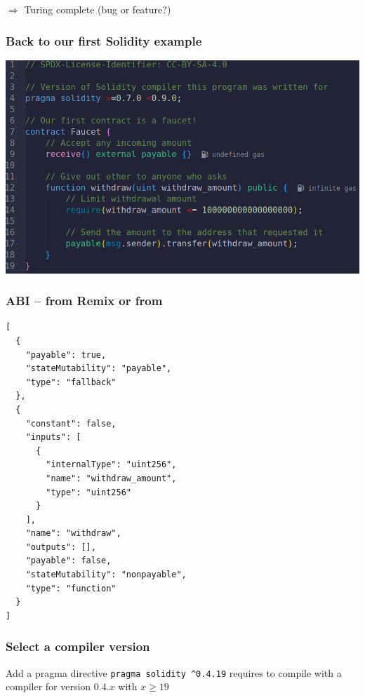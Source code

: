 \documentclass[11pt]{beamer}  %
\def\codesize{\smaller}
\def\<#1>{\codeid{#1}}
\newcommand{\codeid}[1]{\ifmmode{\mbox{\codesize\ttfamily{#1}}}\else{\codesize\ttfamily #1}\fi}
\begin{document}
\begin{frame}
\begin{greenbox}{}
    \begin{center}
      \alert{$\Rightarrow$ Turing complete (bug or feature?)}
    \end{center}

  \end{greenbox}

\end{frame}

\begin{frame}\frametitle{Back to our first Solidity example}
  \begin{center}
    \includegraphics[width=\textwidth,clip=false]{pictures/faucet_sol.png}
  \end{center}
\end{frame}

\begin{frame}[fragile]\frametitle{ABI -- from Remix or from \<solc>}

{\scriptsize\begin{verbatim}
[
  {
    "payable": true,
    "stateMutability": "payable",
    "type": "fallback"
  },
  {
    "constant": false,
    "inputs": [
      {
        "internalType": "uint256",
        "name": "withdraw_amount",
        "type": "uint256"
      }
    ],
    "name": "withdraw",
    "outputs": [],
    "payable": false,
    "stateMutability": "nonpayable",
    "type": "function"
  }
]
\end{verbatim}}
\end{frame}

\begin{frame}[fragile]\frametitle{Select a compiler version}

  \begin{greenbox}{Add a pragma directive}
    \verb!pragma solidity ^0.4.19! requires to compile with a compiler for version $0.4.x$ with $x\ge 19$
  \end{greenbox}

\end{frame}
\end{document}
